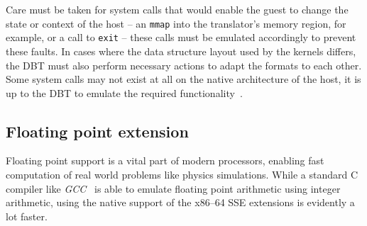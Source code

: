 Care must be taken for system calls that would enable the guest to change the state or context of the host -- an \texttt{mmap} into the translator's memory region, for example, or a call to \texttt{exit} -- these calls must be emulated accordingly to prevent these faults.
In cases where the data structure layout used by the kernels differs, the DBT must also perform necessary actions to adapt the formats to each other.
Some system calls may not exist at all on the native architecture of the host, it is up to the DBT to emulate the required functionality~\cite[S. 2f.]{bintrans}.

\subsection{Floating point extension}
\label{subsec:fp_extension}
Floating point support is a vital part of modern processors, enabling fast computation of real world problems like physics simulations.
While a standard C compiler like \textit{GCC}~\cite{gcc-web} is able to emulate floating point arithmetic using integer arithmetic, using the native support of the x86--64 SSE extensions is evidently a lot faster.

